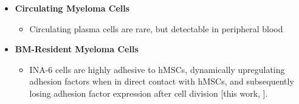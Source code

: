 \begin{itemize}
\begin{itemize}
            \end{itemize}

      \item \textbf{Circulating Myeloma Cells}
            \begin{itemize}
                  \item Circulating plasma cells are rare, but detectable in peripheral blood
                        \cite{witzigDetectionMyelomaCells1996}

            \end{itemize}

      \item \textbf{BM-Resident Myeloma Cells}
            \begin{itemize}
                  \item INA-6 cells are highly adhesive to hMSCs, dynamically
                        upregulating adhesion factors when in direct contact with
                        hMSCs, and subsequently losing adhesion factor expression after
                        cell division [this work,
                                    \citet{kuricModelingMyelomaDissemination2024}].



            \end{itemize}

\end{itemize}

